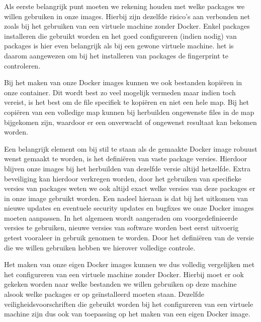 Als eerste belangrijk punt moeten we rekening houden met welke packages we willen gebruiken in onze images. Hierbij zijn dezelfde risico's aan verbonden net zoals bij het gebruiken van een virtuele machine zonder Docker. Enkel packages installeren die gebruikt worden en het goed configureren (indien nodig) van packages is hier even belangrijk als bij een gewone virtuele machine. het is daarom aangewezen om bij het installeren van packages de fingerprint te controleren. 

Bij het maken van onze Docker images kunnen we ook bestanden kopiëren in onze container. Dit wordt best zo veel mogelijk vermeden maar indien toch vereist, is het best om de file specifiek te kopiëren en niet een hele map. Bij het copiëren van een volledige map kunnen bij herbuilden ongewenste files in de map bijgekomen zijn, waardoor er een onverwacht of ongewenst resultaat kan bekomen worden. 

Een belangrijk element om bij stil te staan als de gemaakte Docker image robuust wenst gemaakt te worden, is het definiëren van vaste package versies. Hierdoor blijven onze images bij het herbuilden van dezelfde versie altijd hetzelfde. Extra beveiliging kan hierdoor verkregen worden, door het gebruiken van specifieke versies van packages weten we ook altijd exact welke versies van deze packages er in onze image gebruikt worden. Een nadeel hieraan is dat bij het uitkomen van nieuwe updates en eventuele security updates en bugfixes we onze Docker images moeten aanpassen. In het algemeen wordt aangeraden om voorgedefinieerde versies te gebruiken, nieuwe versies van software worden best eerst uitvoerig getest vooraleer in gebruik genomen te worden. Door het definiëren van de versie die we willen gebruiken hebben we hierover volledige controle.

Het maken van onze eigen Docker images kunnen we dus volledig vergelijken met het configureren van een virtuele machine zonder Docker. Hierbij moet er ook gekeken worden naar welke bestanden we willen gebruiken op deze machine alsook welke packages er op geïnstalleerd moeten staan. Dezelfde veiligheidsvoorschriften die gebruikt worden bij het configureren van een virtuele machine zijn dus ook van toepassing op het maken van een eigen Docker image.


